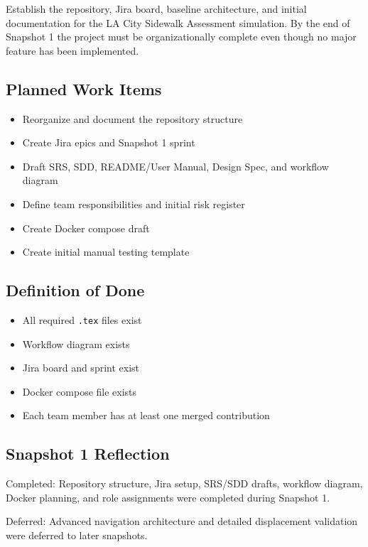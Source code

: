 \documentclass[11pt]{article}
\begin{document}
Establish the repository, Jira board, baseline architecture, and initial documentation for the LA City Sidewalk Assessment simulation. By the end of Snapshot 1 the project must be organizationally complete even though no major feature has been implemented.

\subsection{Planned Work Items}

\begin{itemize}[leftmargin=*]
  \item Reorganize and document the repository structure
  \item Create Jira epics and Snapshot 1 sprint
  \item Draft SRS, SDD, README/User Manual, Design Spec, and workflow diagram
  \item Define team responsibilities and initial risk register
  \item Create Docker compose draft
  \item Create initial manual testing template
\end{itemize}

\subsection{Definition of Done}

\begin{itemize}[leftmargin=*]
  \item All required \texttt{.tex} files exist
  \item Workflow diagram exists
  \item Jira board and sprint exist
  \item Docker compose file exists
  \item Each team member has at least one merged contribution
\end{itemize}

\subsection{Snapshot 1 Reflection}

Completed: Repository structure, Jira setup, SRS/SDD drafts, workflow diagram, Docker planning, and role assignments were completed during Snapshot 1.

Deferred: Advanced navigation architecture and detailed displacement validation were deferred to later snapshots.
\end{document}

